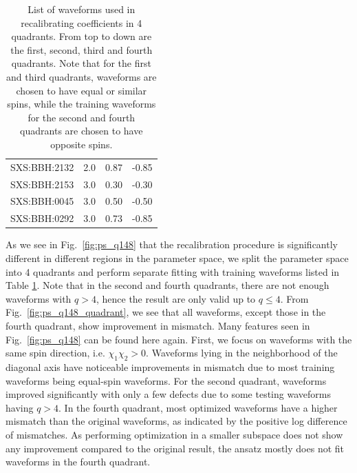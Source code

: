 \documentclass[twocolumn]{aastex631}
\begin{document}
\begin{table}[t]
\begin{tabularx}{0.8\columnwidth}{@{\extracolsep{\fill}}lrrr}
		SXS:BBH:2132 & 2.0 & 0.87     & -0.85    \\
		SXS:BBH:2153 & 3.0 & 0.30     & -0.30    \\
		SXS:BBH:0045 & 3.0 & 0.50     & -0.50    \\
		SXS:BBH:0292 & 3.0 & 0.73     & -0.85    \\ \midrule\bottomrule
	\end{tabularx}
	\caption{List of waveforms used in recalibrating coefficients in 4 quadrants. From top to down are the first, second, third and fourth quadrants. Note that for the first and third quadrants, waveforms are chosen to have equal or similar spins, while the training waveforms for the second and fourth quadrants are chosen to have opposite spins.}
	\label{tab:quadrants}
\end{table}

As we see in Fig.~\ref{fig:ps_q148} that the recalibration procedure is significantly different in different regions in the parameter space, we split the parameter space into 4 quadrants and perform separate fitting with training waveforms listed in Table \ref{tab:quadrants}. Note that in the second and fourth quadrants, there are not enough waveforms with $q>4$, hence the result are only valid up to $q\leq4$. From Fig.~\ref{fig:ps_q148_quadrant}, we see that all waveforms, except those in the fourth quadrant, show improvement in mismatch. Many features seen in Fig.~\ref{fig:ps_q148} can be found here again. First, we focus on waveforms with the same spin direction, i.e. $\chi_1\chi_2>0$. Waveforms lying in the neighborhood of the diagonal axis have noticeable improvements in mismatch due to most training waveforms being equal-spin waveforms. For the second quadrant, waveforms improved significantly with only a few defects due to some testing waveforms having $q>4$. In the fourth quadrant, most optimized waveforms have a higher mismatch than the original waveforms, as indicated by the positive log difference of mismatches. As performing optimization in a smaller subspace does not show any improvement compared to the original result, the ansatz mostly does not fit waveforms in the fourth quadrant. 
\end{document}
